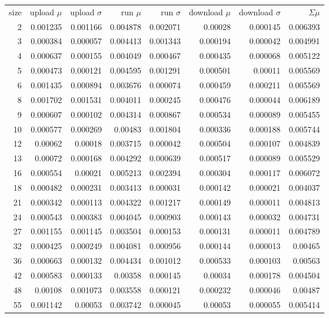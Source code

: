 \begin{longtable}{r r r r r r r r}
size & upload $\mu$  & upload $\sigma$ & run $\mu$ & run $\sigma$ & download $\mu$ & download $\sigma$ & $\Sigma \mu$ \\
2 & 0.001235 & 0.001166 & 0.004878 & 0.002071 & 0.00028 & 0.000145 & 0.006393 \\
3 & 0.000384 & 0.000057 & 0.004413 & 0.001343 & 0.000194 & 0.000042 & 0.004991 \\
4 & 0.000637 & 0.000155 & 0.004049 & 0.000467 & 0.000435 & 0.000068 & 0.005122 \\
5 & 0.000473 & 0.000121 & 0.004595 & 0.001291 & 0.000501 & 0.00011 & 0.005569 \\
6 & 0.001435 & 0.000894 & 0.003676 & 0.000074 & 0.000459 & 0.000211 & 0.005569 \\
8 & 0.001702 & 0.001531 & 0.004011 & 0.000245 & 0.000476 & 0.000044 & 0.006189 \\
9 & 0.000607 & 0.000102 & 0.004314 & 0.000867 & 0.000534 & 0.000089 & 0.005455 \\
10 & 0.000577 & 0.000269 & 0.00483 & 0.001804 & 0.000336 & 0.000188 & 0.005744 \\
12 & 0.00062 & 0.00018 & 0.003715 & 0.000042 & 0.000504 & 0.000107 & 0.004839 \\
13 & 0.00072 & 0.000168 & 0.004292 & 0.000639 & 0.000517 & 0.000089 & 0.005529 \\
16 & 0.000554 & 0.00021 & 0.005213 & 0.002394 & 0.000304 & 0.000117 & 0.006072 \\
18 & 0.000482 & 0.000231 & 0.003413 & 0.000031 & 0.000142 & 0.000021 & 0.004037 \\
21 & 0.000342 & 0.000113 & 0.004322 & 0.001217 & 0.000149 & 0.000011 & 0.004813 \\
24 & 0.000543 & 0.000383 & 0.004045 & 0.000903 & 0.000143 & 0.000032 & 0.004731 \\
27 & 0.001155 & 0.001145 & 0.003504 & 0.000153 & 0.000131 & 0.000011 & 0.004789 \\
32 & 0.000425 & 0.000249 & 0.004081 & 0.000956 & 0.000144 & 0.000013 & 0.00465 \\
36 & 0.000663 & 0.000132 & 0.004434 & 0.001012 & 0.000533 & 0.000103 & 0.00563 \\
42 & 0.000583 & 0.000133 & 0.00358 & 0.000145 & 0.00034 & 0.000178 & 0.004504 \\
48 & 0.00108 & 0.001073 & 0.003558 & 0.000121 & 0.000232 & 0.000046 & 0.00487 \\
55 & 0.001142 & 0.00053 & 0.003742 & 0.000045 & 0.00053 & 0.000055 & 0.005414 \\

\end{longtable}
